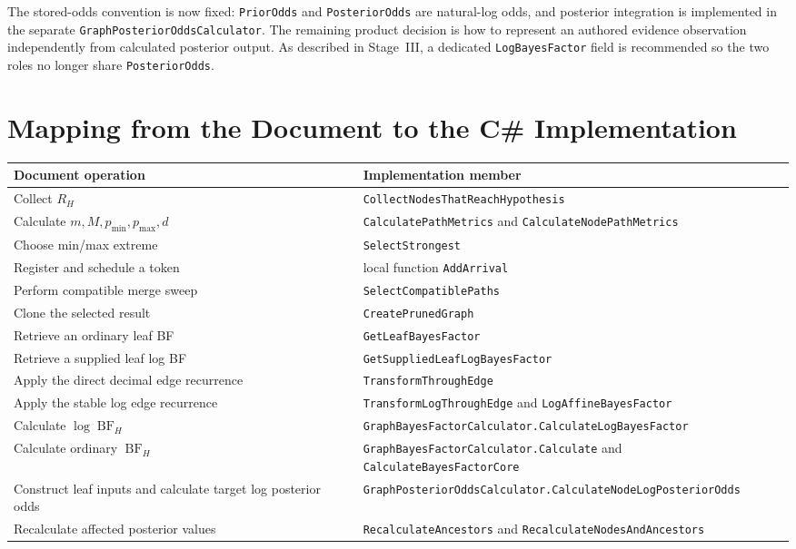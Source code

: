 \documentclass[11pt]{article}
\newcommand{\BF}{\operatorname{BF}}
\begin{document}
The stored-odds convention is now fixed: \texttt{PriorOdds} and
\texttt{PosteriorOdds} are natural-log odds, and posterior integration is
implemented in the separate \texttt{GraphPosteriorOddsCalculator}.  The
remaining product decision is how to represent an authored evidence
observation independently from calculated posterior output.  As described in
Stage~III, a dedicated \texttt{LogBayesFactor} field is recommended so the two
roles no longer share \texttt{PosteriorOdds}.

\section{Mapping from the Document to the C\# Implementation}

\begin{center}
\begin{tabular}{p{}p{}}
\toprule
Document operation & Implementation member \\
\midrule
Collect \(R_H\) & \texttt{CollectNodesThatReachHypothesis} \\
Calculate \(m,M,p_{\min},p_{\max},d\) & \texttt{CalculatePathMetrics} and
    \texttt{CalculateNodePathMetrics} \\
Choose min/max extreme & \texttt{SelectStrongest} \\
Register and schedule a token & local function \texttt{AddArrival} \\
Perform compatible merge sweep & \texttt{SelectCompatiblePaths} \\
Clone the selected result & \texttt{CreatePrunedGraph} \\
Retrieve an ordinary leaf BF
    & \texttt{GetLeafBayesFactor} \\
Retrieve a supplied leaf log BF
    & \texttt{GetSuppliedLeafLogBayesFactor} \\
Apply the direct decimal edge recurrence & \texttt{TransformThroughEdge} \\
Apply the stable log edge recurrence & \texttt{TransformLogThroughEdge} and
    \texttt{LogAffineBayesFactor} \\
Calculate \(\log\BF_H\)
    & \texttt{GraphBayesFactorCalculator.CalculateLogBayesFactor} \\
Calculate ordinary \(\BF_H\)
    & \texttt{GraphBayesFactorCalculator.Calculate} and
      \texttt{CalculateBayesFactorCore} \\
Construct leaf inputs and calculate target log posterior odds
    & \texttt{GraphPosteriorOddsCalculator.CalculateNodeLogPosteriorOdds} \\
Recalculate affected posterior values
    & \texttt{RecalculateAncestors} and
      \texttt{RecalculateNodesAndAncestors} \\
\bottomrule
\end{tabular}
\end{center}
\end{document}
